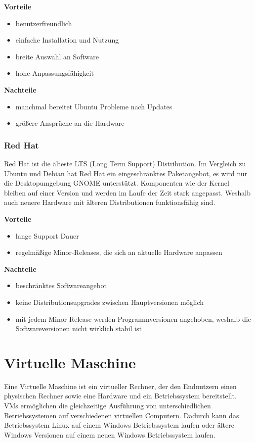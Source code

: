 \textbf{Vorteile}
\begin{itemize}
	\item benutzerfreundlich
	\item einfache Installation und Nutzung
	\item breite Auswahl an Software
	\item hohe Anpassungsfähigkeit
\end{itemize}

\textbf{Nachteile}
\begin{itemize}
	\item manchmal bereitet Ubuntu Probleme nach Updates
	\item größere Ansprüche an die Hardware
\end{itemize}


\subsubsection{Red Hat}
Red Hat ist die älteste LTS (Long Term Support) Distribution. Im Vergleich zu Ubuntu und Debian hat Red Hat ein eingeschränktes Paketangebot, es wird nur die Desktopumgebung GNOME unterstützt. Komponenten wie der Kernel bleiben auf einer Version und werden im Laufe der Zeit stark angepasst. Weshalb auch neuere Hardware mit älteren Distributionen funktionsfähig sind. \textcite{RedHatEnterpriseLinux}

\textbf{Vorteile}
\begin{itemize}
	\item lange Support Dauer
	\item regelmäßige Minor-Releases, die sich an aktuelle Hardware anpassen
\end{itemize}

\textbf{Nachteile}
\begin{itemize}
	\item beschränktes Softwareangebot 
	\item keine Distributionsupgrades zwischen Hauptversionen möglich
	\item mit jedem Minor-Release werden Programmversionen angehoben, weshalb die Softwareversionen nicht wirklich stabil ist
\end{itemize}


\section{Virtuelle Maschine}
Eine Virtuelle Maschine ist ein virtueller Rechner, der den Endnutzern einen physischen Rechner sowie eine Hardware und ein Betriebssystem bereitstellt. VMs ermöglichen die gleichzeitige Ausführung von unterschiedlichen Betriebssystemen auf verschiedenen virtuellen Computern. Dadurch kann das Betriebssystem Linux auf einem Windows Betriebssystem laufen oder ältere Windows Versionen auf einem neuen Windows Betriebssystem laufen. \textcite{WasIstEineVirtualMachine}
\textcite{VirtuelleMaschineDefinition} \textcite{VirtualMachineAdvantagesAndDisadvantages}

